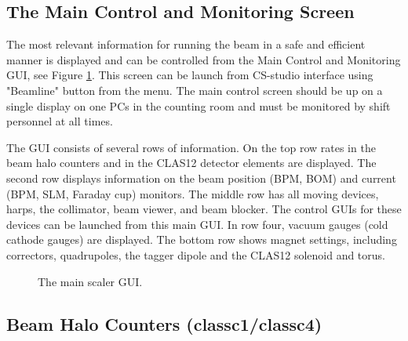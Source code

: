 \documentclass[12pt]{article}
\begin{document}
\subsection{The Main Control and Monitoring Screen}
\indent

The most relevant information for running the beam in a safe and efficient manner is displayed and can be controlled from the Main Control and Monitoring GUI, see Figure \ref{fig:scaler}. This screen can be launch from CS-studio interface using "Beamline" button from the menu. The main control screen should be up on a single display on one PCs in the counting room and must be monitored by shift personnel at all times. 

The GUI consists of several rows of information. On the top row rates in the beam halo counters and in the CLAS12 detector elements are displayed. The second row displays information on the beam position (BPM, BOM) and current (BPM, SLM, Faraday cup) monitors. The middle row has all moving devices, harps, the collimator, beam viewer, and beam blocker. The control GUIs for these devices can be launched from this main GUI. In row four, vacuum gauges (cold cathode gauges) are displayed. The bottom row shows magnet settings, including correctors, quadrupoles, the tagger dipole and the CLAS12 solenoid and torus.   


\begin{figure}[tbhp]
{\centering {} \par}
\caption{The main scaler GUI.}
 \label{fig:scaler}
\end{figure}

\subsection{Beam Halo Counters (classc1/classc4) \label{sec:scaler_a}}
\indent
\end{document}
